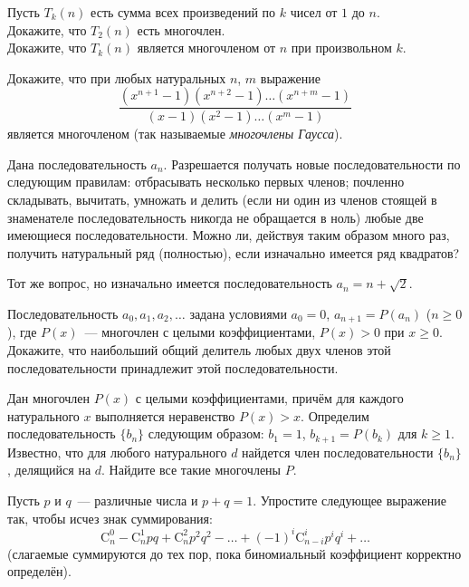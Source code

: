 


\begin{problems}

\item
Пусть $T_{k}(n)$ есть сумма всех произведений по $k$ чисел от $1$ до $n$.
\\
\subproblem
Докажите, что $T_{2}(n)$ есть многочлен.
\\
\subproblem
Докажите, что $T_{k}(n)$ является многочленом от $n$ при произвольном $k$.

\item
Докажите, что при любых натуральных $n$, $m$ выражение
\[
    \frac
        {(x^{n+1} - 1) (x^{n+2} - 1) \ldots (x^{n+m} - 1)}
        {(x - 1) (x^{2} - 1) \ldots (x^{m} - 1)}
\]
является многочленом (так называемые \emph{многочлены Гаусса}).

\item
Дана последовательность $a_{n}$.
Разрешается получать новые последовательности по следующим правилам:
отбрасывать несколько первых членов;
почленно складывать, вычитать, умножать и делить (если ни один из членов
стоящей в знаменателе последовательность никогда не обращается в ноль) любые
две имеющиеся последовательности.
Можно ли, действуя таким образом много раз, получить натуральный ряд
(полностью), если изначально имеется ряд квадратов?

\item
Тот же вопрос, но изначально имеется последовательность $a_{n} = n + \sqrt{2}$.

\item
Последовательность $a_{0}, a_{1}, a_{2}, \ldots$ задана условиями
$a_{0} = 0$,  $a_{n+1} = P(a_{n})$ ($n \geq 0$),
где $P(x)$~--- многочлен с целыми коэффициентами, $P(x) > 0$ при $x \geq 0$.
Докажите, что наибольший общий делитель любых двух членов этой
последовательности принадлежит этой последовательности.

\item
Дан многочлен $P(x)$ с целыми коэффициентами, причём для каждого
натурального $x$ выполняется неравенство $P(x) > x$.
Определим последовательность $\{ b_{n} \}$ следующим образом:
$b_{1} = 1$, $b_{k+1} = P(b_{k})$ для $k \geq 1$.
Известно, что для любого натурального $d$ найдется член
последовательности $\{ b_{n} \}$, делящийся на $d$.
Найдите все такие многочлены $P$.

\renewcommand\binom[2]{\mathrm{C}_{#1}^{#2}}

\item
Пусть $p$ и $q$~--- различные числа и $p + q = 1$.
Упростите следующее выражение так, чтобы исчез знак суммирования:
\[
    \binom{n}{0} - \binom{n}{1} p q + \binom{n}{2} p^{2} q^{2}
    - \ldots + (-1)^{i} \binom{n - i}{i} p^{i} q^{i} + \ldots
\]
(слагаемые суммируются до тех пор, пока биномиальный коэффициент корректно
определён).

\end{problems}

